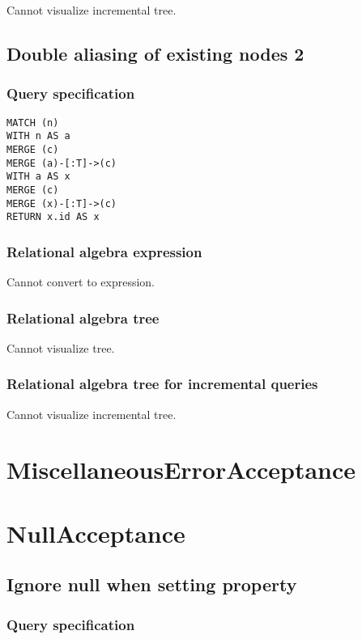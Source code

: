 Cannot visualize incremental tree.

\subsection{Double aliasing of existing nodes 2}

\subsubsection*{Query specification}

\begin{lstlisting}
MATCH (n)
WITH n AS a
MERGE (c)
MERGE (a)-[:T]->(c)
WITH a AS x
MERGE (c)
MERGE (x)-[:T]->(c)
RETURN x.id AS x
\end{lstlisting}

\subsubsection*{Relational algebra expression}

Cannot convert to expression.

\subsubsection*{Relational algebra tree}

Cannot visualize tree.

\subsubsection*{Relational algebra tree for incremental queries}

Cannot visualize incremental tree.

\section{MiscellaneousErrorAcceptance}

\section{NullAcceptance}

\subsection{Ignore null when setting property}

\subsubsection*{Query specification}

